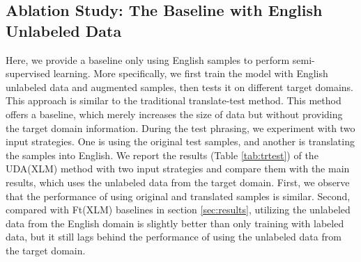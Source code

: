 \documentclass{article} \usepackage{iclr2020_conference,times}
\begin{document}
\subsection{Ablation Study: The Baseline with English Unlabeled Data}
\label{app:english-baseline}

Here, we provide a baseline only using English samples to perform semi-supervised learning. More specifically, we first train the model with English unlabeled data and augmented samples, then tests it on different target domains. 
This approach is similar to the traditional translate-test method.
This method offers a baseline, which merely increases the size of data but without providing the target domain information. 
During the test phrasing, we experiment with two input strategies. One is using the original test samples, and another is translating the samples into English. 
We report the results (Table \ref{tab:trtest}) of the UDA(XLM) method with two input strategies and compare them with the main results, which uses the unlabeled data from the target domain. 
First, we observe that the performance of using original and translated samples is similar. 
Second, compared with Ft(XLM) baselines in section \ref{sec:results}, utilizing the unlabeled data from the English domain is slightly better than only training with labeled data, but it still lags behind the performance of using the unlabeled data from the target domain.  

\begin{table}[!ht]
\centering
    \caption{The first part is the baseline results using the English unlabeled data. The second part is the results using the unlabeled data from the target domain, which are copied from the section \ref{sec:results}. }
    \label{tab:trtest}
\end{table}
\end{document}
